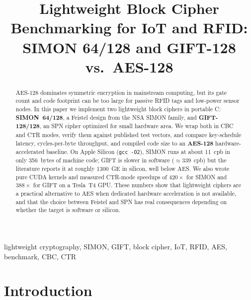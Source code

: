 \documentclass[conference]{IEEEtran}
\begin{document}
\title{Lightweight Block Cipher Benchmarking for IoT and RFID:\\
SIMON 64/128 and GIFT-128 vs.\ AES-128}

\author{
\and
{}
\and
{}
}

\maketitle

\begin{abstract}
AES-128 dominates symmetric encryption in mainstream computing, but its
gate count and code footprint can be too large for passive RFID tags and
low-power sensor nodes.  In this paper we implement two lightweight block
ciphers in portable C: \textbf{SIMON~64/128}, a Feistel design from the
NSA SIMON family, and \textbf{GIFT-128/128}, an SPN cipher optimized for
small hardware area.  We wrap both in CBC and CTR modes, verify them
against published test vectors, and compare key-schedule latency,
cycles-per-byte throughput, and compiled code size to an \textbf{AES-128}
hardware-accelerated baseline.  On Apple Silicon (\texttt{gcc~-O2}),
SIMON runs at about 11~cpb in only 356~bytes of machine code; GIFT is
slower in software ($\approx$339~cpb) but the literature reports it at
roughly 1300~GE in silicon, well below AES.  We also wrote pure CUDA
kernels and measured CTR-mode speedups of $420\times$ for SIMON and
$388\times$ for GIFT on a Tesla~T4 GPU.  These numbers show that
lightweight ciphers are a practical alternative to AES when dedicated
hardware acceleration is not available, and that the choice between
Feistel and SPN has real consequences depending on whether the target is
software or silicon.
\end{abstract}

\begin{IEEEkeywords}
lightweight cryptography, SIMON, GIFT, block cipher, IoT, RFID, AES,
benchmark, CBC, CTR
\end{IEEEkeywords}

\section{Introduction}
\end{document}
